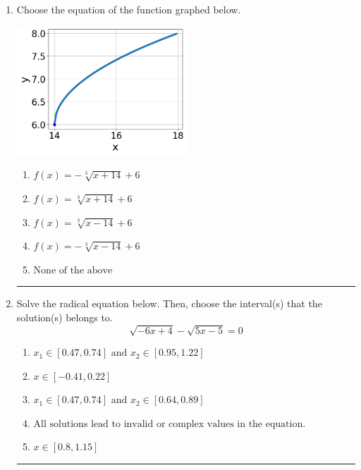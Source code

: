 \documentclass[14pt]{extbook}
\newcommand{\litem}[1]{\item#1\hspace*{-1cm}\rule{\textwidth}{0.4pt}}
\begin{document}
\begin{enumerate}
{\begin{enumerate}[label=\Alph*.]
\end{enumerate} }
\litem{
Choose the equation of the function graphed below.
\begin{center}
    \includegraphics[width=0.5\textwidth]{../Figures/radicalGraphToEquationA.png}
\end{center}
\begin{enumerate}[label=\Alph*.]
\item \( f(x) = - \sqrt[3]{x + 14} + 6 \)
\item \( f(x) = \sqrt[3]{x + 14} + 6 \)
\item \( f(x) = \sqrt[3]{x - 14} + 6 \)
\item \( f(x) = - \sqrt[3]{x - 14} + 6 \)
\item \( \text{None of the above} \)

\end{enumerate} }
\litem{
Solve the radical equation below. Then, choose the interval(s) that the solution(s) belongs to.\[ \sqrt{-6 x + 4} - \sqrt{5 x - 5} = 0 \]\begin{enumerate}[label=\Alph*.]
\item \( x_1 \in [0.47, 0.74] \text{ and } x_2 \in [0.95,1.22] \)
\item \( x \in [-0.41,0.22] \)
\item \( x_1 \in [0.47, 0.74] \text{ and } x_2 \in [0.64,0.89] \)
\item \( \text{All solutions lead to invalid or complex values in the equation.} \)
\item \( x \in [0.8,1.15] \)

\end{enumerate} }
\end{enumerate}
\end{document}
